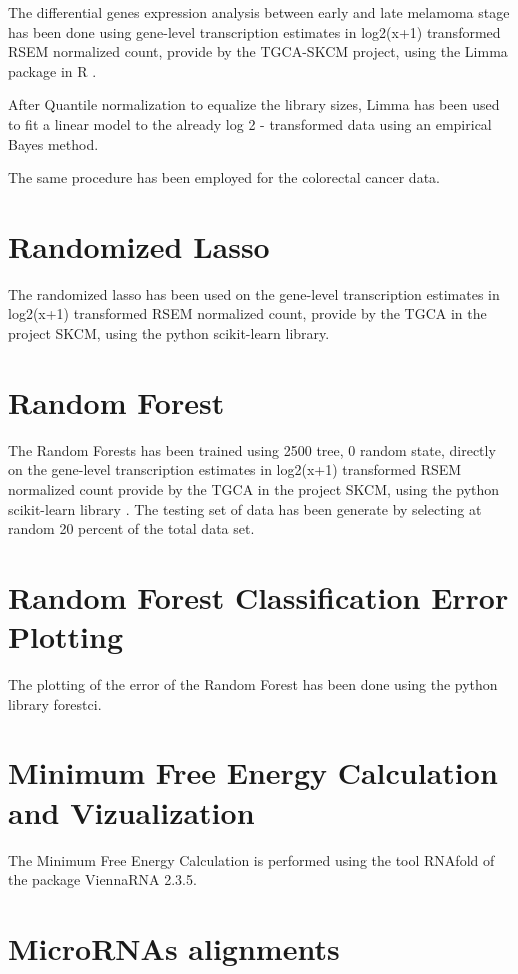 \documentclass[a4paper,12pt]{report}
\begin{document}
The differential genes expression analysis between early and late melamoma stage has been done using gene-level transcription estimates in log2(x+1) transformed RSEM normalized count, provide by the TGCA-SKCM project, using the Limma package in R \cite{limma}.

After Quantile normalization to equalize the library sizes\cite{limma}, Limma has been used to fit a linear model to the already log 2 - transformed data using an empirical Bayes method\cite{limma}.

The same procedure has been employed for the colorectal cancer data.


\section{Randomized Lasso}

The randomized lasso has been used  on the gene-level transcription estimates in log2(x+1) transformed RSEM normalized count, provide by the TGCA in the project SKCM, using the python scikit-learn library\cite{scikit}.

\section{Random Forest}

The Random Forests has been trained using 2500 tree, 0 random state, directly on the gene-level transcription estimates in log2(x+1) transformed RSEM normalized count provide by the TGCA in the project SKCM, using the python scikit-learn library \cite{scikit}.
The testing set of data has been generate by selecting at random 20 percent of the total data set.

\section{Random Forest Classification Error Plotting}

The plotting of the error of the Random Forest has been done using the python library forestci. 

\section{Minimum Free Energy Calculation and Vizualization}

The Minimum Free Energy Calculation is performed using the tool RNAfold of the package ViennaRNA 2.3.5. \cite{vienna}

\section{MicroRNAs alignments}
\end{document}
